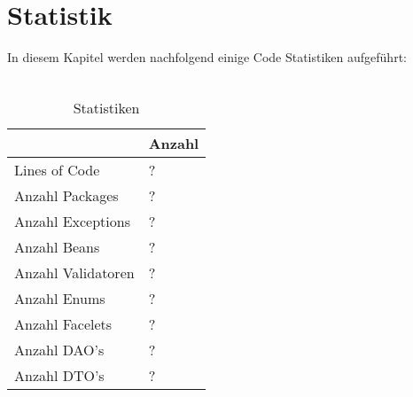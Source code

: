 \chapter{Statistik}

In diesem Kapitel werden nachfolgend einige Code Statistiken aufgeführt:\ \\
\ \\
\begin{table}[h]
	\begin{center}
		\begin{tabular}{|p{6cm}|p{6cm}|}
			\hline \textbf{} & \textbf{Anzahl}  \\ 
			\hline Lines of Code &  ? \\ 
			\hline Anzahl Packages & ?  \\ 
			\hline Anzahl Exceptions & ? \\ 
			\hline Anzahl Beans &  ? \\ 
			\hline Anzahl Validatoren & ?\\ 
			\hline Anzahl Enums & ?\\
			\hline Anzahl Facelets & ?\\
			\hline Anzahl DAO's & ?\\
			\hline Anzahl DTO's & ?\\
			\hline 
		\end{tabular} 
		\caption{Statistiken}
		\label{fig:Statistiken}
	\end{center}
\end{table}